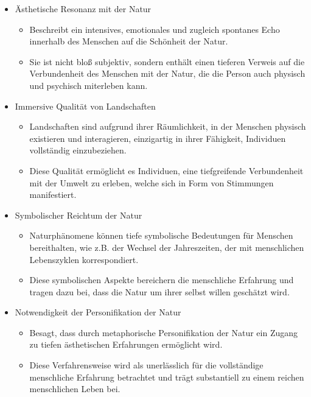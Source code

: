 \documentclass{article}
\begin{document}
\begin{itemize}
	\item Ästhetische Resonanz mit der Natur
	      \begin{itemize}
		      \item Beschreibt ein intensives, emotionales und zugleich spontanes Echo innerhalb des Menschen auf die Schönheit der Natur.
		      \item Sie ist nicht bloß subjektiv, sondern enthält einen tieferen Verweis auf die Verbundenheit des Menschen mit der Natur, die die Person auch physisch und psychisch miterleben kann.
	      \end{itemize}

	\item Immersive Qualität von Landschaften
	      \begin{itemize}
		      \item Landschaften sind aufgrund ihrer Räumlichkeit, in der Menschen physisch existieren und interagieren, einzigartig in ihrer Fähigkeit, Individuen vollständig einzubeziehen.
		      \item Diese Qualität ermöglicht es Individuen, eine tiefgreifende Verbundenheit mit der Umwelt zu erleben, welche sich in Form von Stimmungen manifestiert.
	      \end{itemize}

	\item Symbolischer Reichtum der Natur
	      \begin{itemize}
		      \item Naturphänomene können tiefe symbolische Bedeutungen für Menschen bereithalten, wie z.B. der Wechsel der Jahreszeiten, der mit menschlichen Lebenszyklen korrespondiert.
		      \item Diese symbolischen Aspekte bereichern die menschliche Erfahrung und tragen dazu bei, dass die Natur um ihrer selbst willen geschätzt wird.
	      \end{itemize}

	\item Notwendigkeit der Personifikation der Natur
	      \begin{itemize}
		      \item Besagt, dass durch metaphorische Personifikation der Natur ein Zugang zu tiefen ästhetischen Erfahrungen ermöglicht wird.
		      \item Diese Verfahrensweise wird als unerlässlich für die vollständige menschliche Erfahrung betrachtet und trägt substantiell zu einem reichen menschlichen Leben bei.
	      \end{itemize}


\end{itemize}
\end{document}
